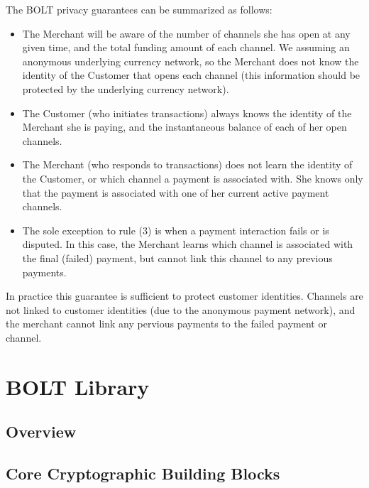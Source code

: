 \documentclass[10pt]{report}
\begin{document}
The BOLT privacy guarantees can be summarized as follows:
\begin{itemize}
\item The Merchant will be aware of the number of channels she has open at any given time, and the total funding amount of each channel. We assuming an anonymous underlying currency network, so the Merchant does not know the identity of the Customer that opens each channel (this information should be protected by the underlying currency network).
\item The Customer (who initiates transactions) always knows the identity of the Merchant she is paying, and the instantaneous balance of each of her open channels.
\item The Merchant (who responds to transactions) does not learn the identity of the Customer, or which channel a payment is associated with. She knows only that the payment is associated with one of her current active payment channels.
\item The sole exception to rule (3) is when a payment interaction fails or is disputed. In this case, the Merchant learns which channel is associated with the final (failed) payment, but cannot link this channel to any previous payments. 
\end{itemize}

In practice this guarantee is sufficient to protect customer identities. Channels are not linked to customer identities (due to the anonymous payment network), and the merchant cannot link any pervious payments to the failed payment or channel.


\chapter{BOLT Library}
\label{ch:bolt}
\thispagestyle{myfancypage}

\section{Overview}


\section{Core Cryptographic Building Blocks}
\label{sec:core}
\end{document}
